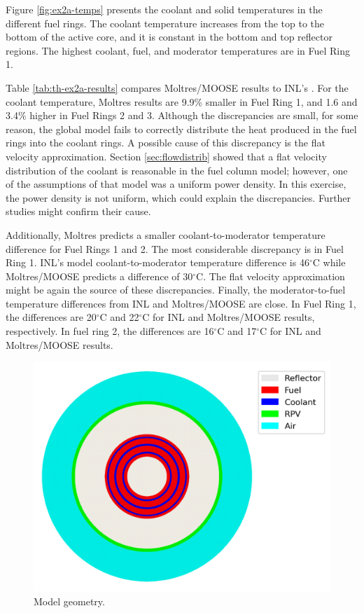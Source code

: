 Figure \ref{fig:ex2a-temps} presents the coolant and solid temperatures in the different fuel rings.
The coolant temperature increases from the top to the bottom of the active core, and it is constant in the bottom and top reflector regions.
The highest coolant, fuel, and moderator temperatures are in Fuel Ring 1.

Table \ref{tab:th-ex2a-results} compares Moltres/MOOSE results to INL's \cite{strydom_inl_2013}.
For the coolant temperature, Moltres results are 9.9\% smaller in Fuel Ring 1, and 1.6 and 3.4\% higher in Fuel Rings 2 and 3.
Although the discrepancies are small, for some reason, the global model fails to correctly distribute the heat produced in the fuel rings into the coolant rings.
A possible cause of this discrepancy is the flat velocity approximation.
Section \ref{sec:flowdistrib} showed that a flat velocity distribution of the coolant is reasonable in the fuel column model; however, one of the assumptions of that model was a uniform power density.
In this exercise, the power density is not uniform, which could explain the discrepancies.
Further studies might confirm their cause.

Additionally, Moltres predicts a smaller coolant-to-moderator temperature difference for Fuel Rings 1 and 2.
The most considerable discrepancy is in Fuel Ring 1.
INL's model coolant-to-moderator temperature difference is 46$^{\circ}$C while Moltres/MOOSE predicts a difference of 30$^{\circ}$C.
The flat velocity approximation might be again the source of these discrepancies.
Finally, the moderator-to-fuel temperature differences from INL and Moltres/MOOSE are close.
In Fuel Ring 1, the differences are 20$^{\circ}$C and 22$^{\circ}$C for INL and Moltres/MOOSE results, respectively.
In fuel ring 2, the differences are 16$^{\circ}$C and 17$^{\circ}$C for INL and Moltres/MOOSE results.

\begin{figure}[htbp!]
  \centering
  \includegraphics[width=0.4\linewidth]{figures-thermal/ex2a-meshC2}
  \hfill
  \caption{Model geometry.}
  \label{fig:ex2a-2nd-model}
\end{figure}


